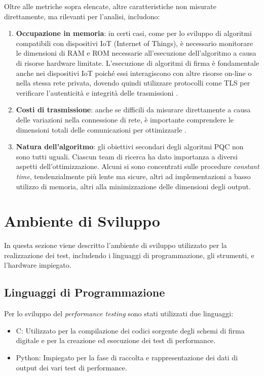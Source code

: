 Oltre alle metriche sopra elencate, altre caratteristiche non misurate direttamente, ma rilevanti per l’analisi, includono:
\begin{enumerate}
    \item \textbf{Occupazione in memoria}: in certi casi, come per lo sviluppo di algoritmi compatibili con dispositivi IoT (Internet of Things), è necessario monitorare le dimensioni di RAM e ROM necessarie all'esecuzione dell'algoritmo a causa di risorse hardware limitate. L'esecuzione di algoritmi di firma è fondamentale anche nei dispositivi IoT poiché essi interagiscono con altre risorse on-line o nella stessa rete privata, dovendo quindi utilizzare protocolli come TLS per verificare l'autenticità e integrità delle trasmissioni \cite{NISTthirdReport}.
    \item \textbf{Costi di trasmissione}: anche se difficili da misurare direttamente a causa delle variazioni nella connessione di rete, è importante comprendere le dimensioni totali delle comunicazioni per ottimizzarle \cite{NISTthirdReport}.
    \item \textbf{Natura dell'algoritmo}: gli obiettivi secondari degli algoritmi PQC non sono tutti uguali. Ciascun team di ricerca ha dato importanza a diversi aspetti dell'ottimizzazione. Alcuni si sono concentrati sulle procedure \textit{constant time}, tendenzialmente più lente ma sicure, altri ad implementazioni a basso utilizzo di memoria, altri alla minimizzazione delle dimensioni degli output.     
\end{enumerate}

\section{Ambiente di Sviluppo}

In questa sezione viene descritto l'ambiente di sviluppo utilizzato per la realizzazione dei test, includendo i linguaggi di programmazione, gli strumenti, e l'hardware impiegato.

\subsection{Linguaggi di Programmazione}
Per lo sviluppo del \textit{performance testing} sono stati utilizzati due linguaggi:
\begin{itemize}
    \item C: Utilizzato per la compilazione dei codici sorgente degli schemi di firma digitale e per la creazione ed esecuzione dei test di performance.
    \item Python: Impiegato per la fase di raccolta e rappresentazione dei dati di output dei vari test di performance.
\end{itemize}

